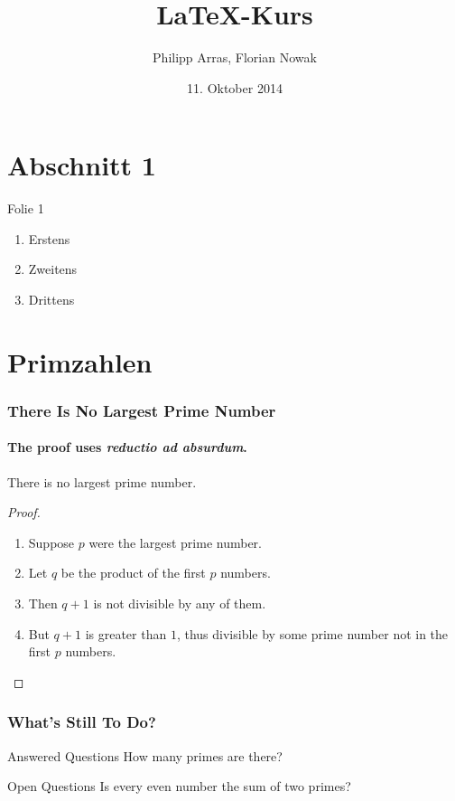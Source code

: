 \documentclass{beamer}
\author{Philipp Arras, Florian Nowak}
\title{\LaTeX -Kurs}
\date{11. Oktober 2014}
\begin{document}
\begin{frame}
\titlepage
\end{frame}

\begin{frame}
\tableofcontents
\end{frame}

\section{Abschnitt 1}
\begin{frame}{Folie 1}
\begin{enumerate}
\item Erstens
\item Zweitens
\item Drittens
\end{enumerate}
\end{frame}

\section{Primzahlen}
\begin{frame}
  \frametitle{There Is No Largest Prime Number}
  \framesubtitle{The proof uses \textit{reductio ad absurdum}.}
  \begin{theorem}
    There is no largest prime number.
  \end{theorem}
  \begin{proof}
    \begin{enumerate}
    \item<1-> Suppose $p$ were the largest prime number.
    \item<2-> Let $q$ be the product of the first $p$ numbers.
    \item<3-> Then $q + 1$ is not divisible by any of them.
    \item<1-> But $q + 1$ is greater than $1$, thus divisible by some prime
      number not in the first $p$ numbers.\qedhere
    \end{enumerate}
\end{proof}
\end{frame}

\begin{frame}
  \frametitle{What’s Still To Do?}
  \begin{block}{Answered Questions}
    How many primes are there?
  \end{block}
  \begin{block}{Open Questions}
    Is every even number the sum of two primes?
  \end{block}
\end{frame}
\end{document}
